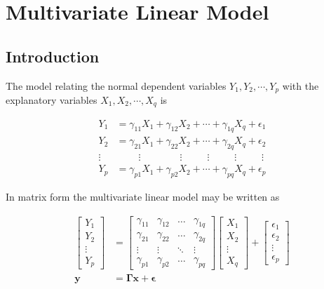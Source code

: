 \hypertarget{MLM}{%
\chapter{Multivariate Linear Model}\label{MLM}}

\hypertarget{introduction-1}{%
\section{Introduction}\label{introduction-1}}

The model relating the normal dependent variables \(Y_1, Y_2, \cdots, Y_p\) with the explanatory variables \(X_1, X_2, \cdots, X_q\) is

\begin{align*}
Y_{1} & =\gamma_{11}X_{1}+\gamma_{12}X_{2}+\cdots+\gamma_{1q}X_{q}+\epsilon_{1}\\
Y_{2} & =\gamma_{21}X_{1}+\gamma_{22}X_{2}+\cdots+\gamma_{2q}X_{q}+\epsilon_{2}\\
\vdots & \;\qquad\vdots\qquad\qquad\vdots\qquad\;\;\vdots\qquad\;\;\vdots\qquad\;\;\vdots\\
Y_{p} & =\gamma_{p1}X_{1}+\gamma_{p2}X_{2}+\cdots+\gamma_{pq}X_{q}+\epsilon_{p}
\end{align*}

In matrix form the multivariate linear model may be written as

\begin{align}
\begin{bmatrix}Y_{1}\\
Y_{2}\\
\vdots\\
Y_{p}
\end{bmatrix} & =\begin{bmatrix}\gamma_{11} & \gamma_{12} & \ldots & \gamma_{1q}\\
\gamma_{21} & \gamma_{22} & \ldots & \gamma_{2q}\\
\vdots & \vdots & \ddots & \vdots\\
\gamma_{p1} & \gamma_{p2} & \ldots & \gamma_{pq}
\end{bmatrix}\begin{bmatrix}X_{1}\\
X_{2}\\
\vdots\\
X_{q}
\end{bmatrix}+\begin{bmatrix}\epsilon_{1}\\
\epsilon_{2}\\
\vdots\\
\epsilon_{p}
\end{bmatrix}\label{eq:MLM1}\\
\mathbf{y} & =\bm{\Gamma}\mathbf{x}+\bm{\epsilon}\label{eq:MLM2}
\end{align}

